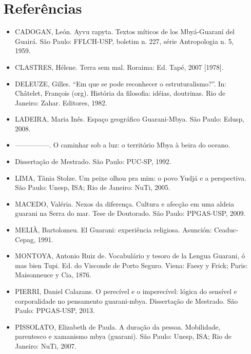 \section{Referências}

\begin{itemize}
\item CADOGAN, León. Ayvu rapyta. Textos míticos de los Mbyá-Guaraní del
Guairá. São Paulo: FFLCH-USP, boletim n. 227, série Antropologia n. 5,
1959.

\item CLASTRES, Hélene. Terra sem mal. Roraima: Ed. Tapé, 2007 [1978].

\item DELEUZE, Gilles. ``Em que se pode reconhecer o estruturalismo?''.
In: Châtelet, François  (org). História da filosofia: idéias,
doutrinas. Rio de Janeiro: Zahar. Editores, 1982.

\item LADEIRA, Maria Inês. Espaço geográfico Guarani-Mbya. São Paulo:
Edusp, 2008.

\item —————. O caminhar sob a luz: o território Mbya à beira do oceano. 
\item Dissertação de Mestrado. São Paulo: PUC-SP, 1992.

\item LIMA, Tânia Stolze. Um peixe olhou pra mim: o povo Yudjá e a
perspectiva. São Paulo: Unesp, ISA; Rio de Janeiro: NuTi, 2005.

\item MACEDO, Valéria. Nexos da diferença. Cultura e afecção em uma
aldeia guarani na Serra do mar. Tese de Doutorado. São Paulo:
PPGAS-USP, 2009.

\item MELIÀ, Bartolomeu. El Guarani: experiência religiosa. Asunción:
Ceaduc-Cepag, 1991.

\item MONTOYA, Antonio Ruiz de. Vocabulário y tesoro de la Lengua
Guarani, ó mas bien Tupi. Ed. do Visconde de Porto Seguro. Viena: Faesy
y Frick; Paris: Maisonneuce y Cia, 1876.

\item PIERRI, Daniel Calazans. O perecível e o imperecível: lógica do
sensível e corporalidade no pensamento guarani-mbya. Dissertação de
Mestrado. São Paulo: PPGAS-USP, 2013.

\item PISSOLATO, Elizabeth de Paula. A duração da pessoa. Mobilidade,
parentesco e xamanismo mbya (guarani). São Paulo: Unesp, ISA; Rio de
Janeiro: NuTi, 2007.


\end{itemize}
